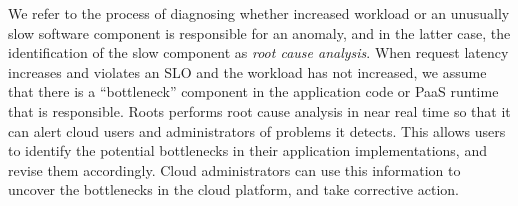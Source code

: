 We refer to the process of diagnosing whether increased workload or
an unusually slow software component is responsible for an anomaly, and in the
latter case, the identification of the slow component as \textit{root cause
analysis}.  When request latency increases and violates an SLO and the
workload has not increased, we assume that there is a ``bottleneck'' component
in the application code or PaaS runtime that is responsible.  Roots performs
root cause analysis in near real time so that it can alert cloud users and
administrators of problems it detects. This allows users to
identify the potential bottlenecks in their application implementations, and revise them
accordingly. Cloud administrators can use this information to uncover the bottlenecks in the cloud
platform, and take corrective action.



